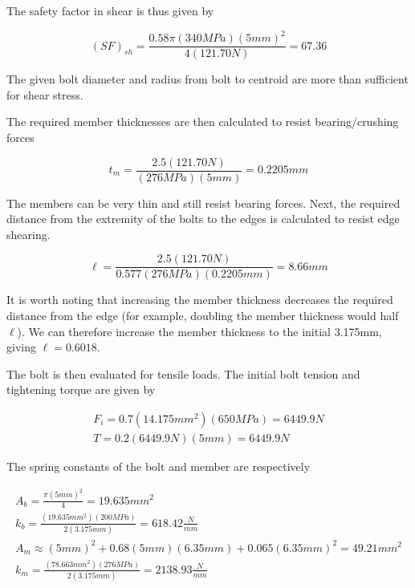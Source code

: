 The safety factor in shear is thus given by

\begin{equation}
    (SF)_{sh} = \frac{0.58\pi  (340MPa)(5mm)^2}{4 (121.70N)} = 67.36
\end{equation}{}

The given bolt diameter and radius from bolt to centroid are more than sufficient for shear stress.

The required member thicknesses are then calculated to resist bearing/crushing forces

\begin{equation}
    t_{m} = \frac{2.5(121.70N)}{(276MPa)(5mm)} = 0.2205mm
\end{equation}{}

The members can be very thin and still resist bearing forces.
Next, the required distance from the extremity of the bolts to the edges is calculated to resist edge shearing.

\begin{equation}
    \ell = \frac{2.5(121.70N)}{0.577(276MPa)(0.2205mm)} = 8.66mm
\end{equation}{}

It is worth noting that increasing the member thickness decreases the required distance from the edge (for example, doubling the member thickness would half $\ell$).
We can therefore increase the member thickness to the initial 3.175mm, giving $\ell=0.6018$.

The bolt is then evaluated for tensile loads.
The initial bolt tension and tightening torque are given by

\begin{gather}
    F_i = 0.7(14.175mm^2)(650MPa) = 6449.9N
    \\
    T = 0.2 (6449.9N) (5mm) = 6449.9N
\end{gather}{}

The spring constants of the bolt and member are respectively

\begin{gather}
    A_b = \frac{\pi(5mm)^2}{4} = 19.635mm^2
    \\
    k_b = \frac{(19.635mm^2)(200MPa)}{2(3.175mm)} = 618.42\frac{N}{mm}
    \\
    A_m \approx (5mm)^2 + 0.68(5mm)(6.35mm) + 0.065(6.35mm)^2 = 49.21mm^2
    \\
    k_m = \frac{(78.663mm^2)(276MPa)}{2(3.175mm)} = 2138.93\frac{N}{mm}
\end{gather}{}

